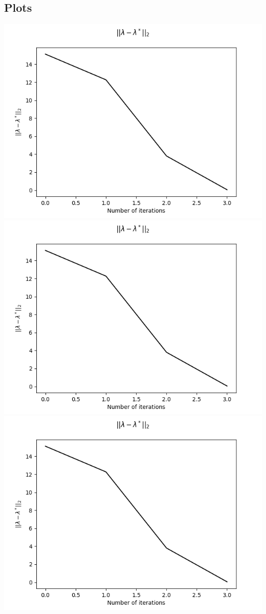 \documentclass[12pt]{article}
\begin{document}
\subsection{Plots}
\includegraphics[scale=0.5]{hw4/plots/plot_3.png}\\
\includegraphics[scale=0.5]{hw4/plots/plot_4.png}\\
\includegraphics[scale=0.5]{hw4/plots/plot_5.png}\\
\end{document}

